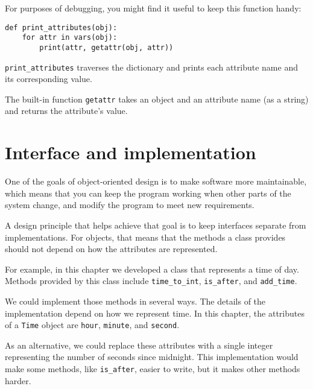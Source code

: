 %
For purposes of debugging, you might find it useful to keep this
function handy:

\begin{lstlisting}
def print_attributes(obj):
    for attr in vars(obj):
        print(attr, getattr(obj, attr))
\end{lstlisting}

%
\verb"print_attributes" traverses the dictionary
and prints each attribute name and its corresponding value.

The built-in function {\tt getattr} takes an object and an attribute
name (as a string) and returns the attribute's value.


\section{Interface and implementation}

One of the goals of object-oriented design is to make software more
maintainable, which means that you can keep the program working when
other parts of the system change, and modify the program to meet new
requirements.

A design principle that helps achieve that goal is to keep
interfaces separate from implementations.  For objects, that means
that the methods a class provides should not depend on how the
attributes are represented.

For example, in this chapter we developed a class that represents
a time of day.  Methods provided by this class include
\verb"time_to_int", \verb"is_after", and \verb"add_time".

We could implement those methods in several ways.  The details of the
implementation depend on how we represent time.  In this chapter, the
attributes of a {\tt Time} object are {\tt hour}, {\tt minute}, and
{\tt second}.

As an alternative, we could replace these attributes with
a single integer representing the number of seconds
since midnight.  This implementation would make some methods,
like \verb"is_after", easier to write, but it makes other methods
harder.

